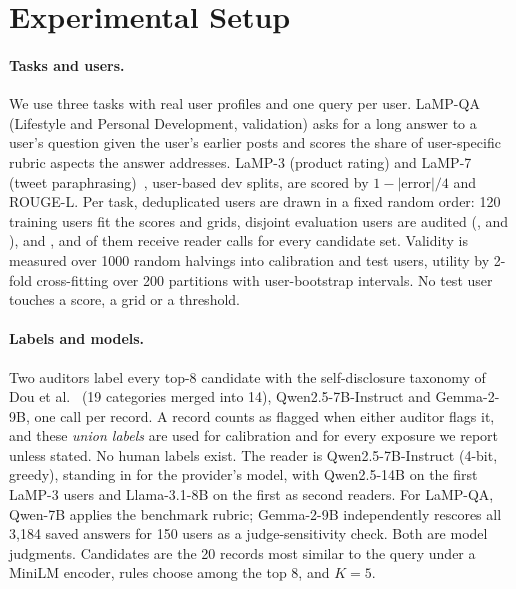 \section{Experimental Setup}
\label{sec:setup}
\paragraph{Tasks and users.}
We use three tasks with real user profiles and one query per user.
LaMP-QA~\cite{salemi2025lampqa} (Lifestyle and Personal Development,
validation) asks for a long answer to a user's question given the user's
earlier posts and scores the share of user-specific rubric aspects the answer
addresses. LaMP-3 (product rating) and LaMP-7 (tweet
paraphrasing)~\cite{salemi2024lamp}, user-based dev splits, are scored by
$1-|\text{error}|/4$ and ROUGE-L. Per task, deduplicated users are drawn in a
fixed random order: 120 training users fit the scores and grids, disjoint
evaluation users are audited (\qaNEval{}, \threeNEval{} and \sevenNEval{}),
and \qaNReader{}, \threeNReader{} and \sevenNReader{} of them receive reader
calls for every candidate set. Validity is measured over 1000 random halvings into calibration and test
users, utility by 2-fold cross-fitting over 200 partitions with user-bootstrap
intervals. No test user touches a score, a grid or a threshold.

\paragraph{Labels and models.}
Two auditors label every top-8 candidate with the self-disclosure taxonomy of
Dou et al.~\cite{dou2024reducing} (19 categories merged into 14),
Qwen2.5-7B-Instruct and Gemma-2-9B, one call per record. A record counts as
flagged when either auditor flags it, and these \emph{union labels} are used
for calibration and for every exposure we report unless stated. No human
labels exist. The reader is Qwen2.5-7B-Instruct (4-bit, greedy), standing in
for the provider's model, with Qwen2.5-14B on the first \FourteenN{} LaMP-3
users and Llama-3.1-8B on the first \threeLlamaN{} as second readers. For
LaMP-QA, Qwen-7B applies the benchmark rubric; Gemma-2-9B independently
rescores all 3,184 saved answers for 150 users as a judge-sensitivity check.
Both are model judgments.
Candidates are the 20 records most similar to the query under a MiniLM
encoder, rules choose among the top 8, and $K=5$.

